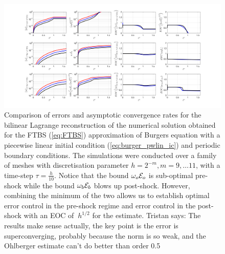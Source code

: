 \documentclass[final]{amsart}
\newcommand{\tristan}[1]{{\color{purple} Tristan says:  #1 }}
\numberwithin{equation}{section}
\begin{document}
\begin{figure}[H] 
	\includegraphics[width=\textwidth]{../figures/fig_FTBS_postshock_bound_comparison_L2L1L1_burgers_offset_0_hatIC}	
	\caption{
	  \label{fig:FTBS_burger_step}
	  Comparison of errors and asymptotic convergence rates for
          the bilinear Lagrange reconstruction of the numerical
          solution obtained for the FTBS (\ref{eq:FTBS}) approximation
          of Burgers equation with a piecewise linear initial
          condition (\ref{eq:burger_pwlin_ic}) and periodic boundary
          conditions. The simulations were conducted over a family of
          meshes with discretisation parameter $h = 2^{-m}, m =
          9,\dots 11$, with a time-step $\tau = \tfrac{h}{10}$. Notice
          that the bound $\omega_o\mathcal{E}_o$ is sub-optimal pre-shock
          while the bound $\omega_b\mathcal{E}_b$ blows up post-shock.
          However, combining the minimum of the two allows us to
          establish optimal error control in the pre-shock regime and
          error control in the post-shock with an EOC of $~h^{1/2}$
          for the estimate.  \tristan{The results make sense actually,
            the key point is the error is superconverging, probably
            because the norm is so weak, and the Ohlberger estimate
            can't do better than order 0.5} }
\end{figure}
\end{document}
